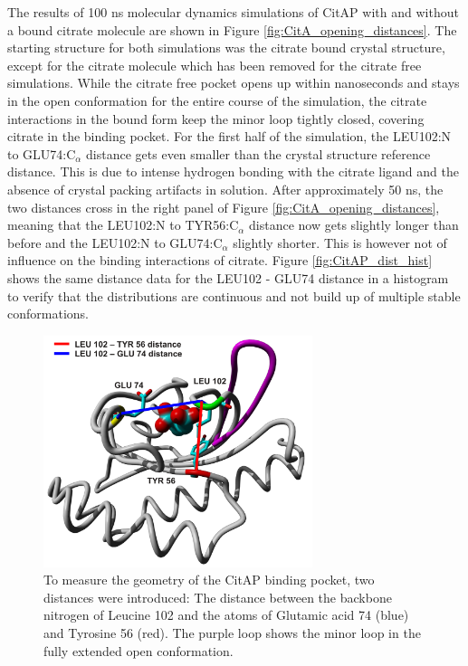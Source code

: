 \documentclass[english, a4paper, 12pt, titlepage, draft]{article}
\begin{document}
The results of 100 ns molecular dynamics simulations of CitAP with and without a bound citrate molecule are shown in Figure \ref{fig:CitA_opening_distances}.
The starting structure for both simulations was the citrate bound crystal structure, except for the citrate molecule which has been removed for the citrate free simulations.
While the citrate free pocket opens up within nanoseconds and stays in the open conformation for the entire course of the simulation, the citrate interactions in the bound form keep the minor loop tightly closed, covering citrate in the binding pocket.
For the first half of the simulation, the LEU102:N to GLU74:C$_{\alpha}$ distance gets even smaller than the crystal structure reference distance.
This is due to intense hydrogen bonding with the citrate ligand and the absence of crystal packing artifacts in solution.
After approximately 50 ns, the two distances cross in the right panel of Figure \ref{fig:CitA_opening_distances}, meaning that the LEU102:N to TYR56:C$_{\alpha}$ distance now gets slightly longer than before and the LEU102:N to GLU74:C$_{\alpha}$ slightly shorter.
This is however not of influence on the binding interactions of citrate.
Figure \ref{fig:CitAP_dist_hist} shows the same distance data for the LEU102 - GLU74 distance in a histogram to verify that the distributions are continuous and not build up of multiple stable conformations.

\begin{figure}
    \centering
    \includegraphics[width=0.7\textwidth]{figures/CitA_pocket2.pdf}
    \caption{To measure the geometry of the CitAP binding pocket, two distances were introduced: The distance between the backbone nitrogen of Leucine 102 and the  atoms of Glutamic acid 74 (blue) and Tyrosine 56 (red).
    The purple loop shows the minor loop in the fully extended open conformation.}
    \label{fig:CitA_pocket}
\end{figure}        
\end{document}
